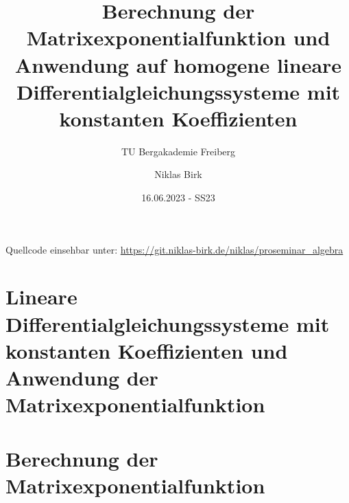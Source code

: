 \documentclass[11pt]{scrartcl}
\title{
    Berechnung der Matrixexponentialfunktion und
    Anwendung auf homogene lineare Differentialgleichungssysteme mit konstanten Koeffizienten
}
\subtitle{TU Bergakademie Freiberg}
\author{Niklas Birk}
\date{16.06.2023 - SS23}
\begin{document}
    \maketitle
    \tableofcontents

    \printbibliography

    \vspace*{\fill}
    Quellcode einsehbar unter: \url{https://git.niklas-birk.de/niklas/proseminar_algebra}

    \newpage

    \section{Lineare Differentialgleichungssysteme mit konstanten Koeffizienten und Anwendung der Matrixexponentialfunktion}\label{sec:dgls-matrixexponential}
    

    \section{Berechnung der Matrixexponentialfunktion}\label{sec:berechnung-matrixexponential}
    
\end{document}
